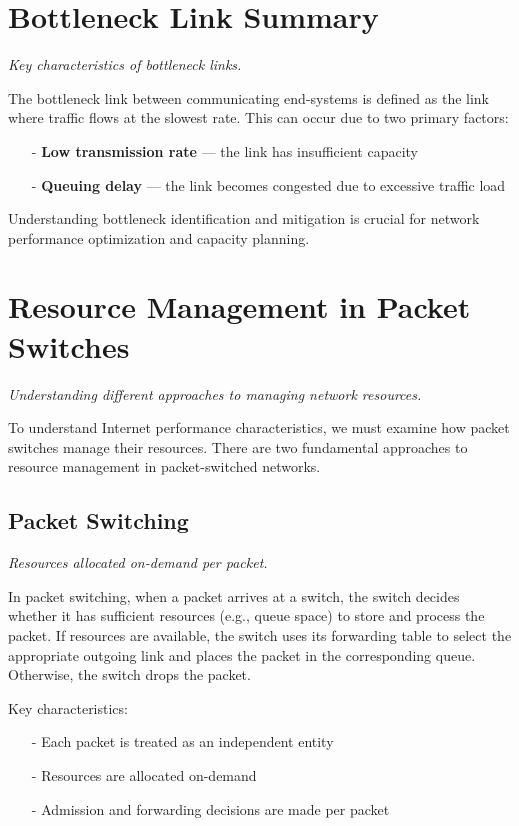 \documentclass[../../compsys.tex]{subfiles}
\begin{document}
\section{Bottleneck Link Summary}
\textit{Key characteristics of bottleneck links.}

The bottleneck link between communicating end-systems is defined as the link where traffic flows at the slowest rate. This can occur due to two primary factors:

\begin{itemize}
  \item[-] \textbf{Low transmission rate} — the link has insufficient capacity
  \item[-] \textbf{Queuing delay} — the link becomes congested due to excessive traffic load
\end{itemize}

Understanding bottleneck identification and mitigation is crucial for network performance optimization and capacity planning.

\section{Resource Management in Packet Switches}
\textit{Understanding different approaches to managing network resources.}

To understand Internet performance characteristics, we must examine how packet switches manage their resources. There are two fundamental approaches to resource management in packet-switched networks.

\subsection{Packet Switching}
\textit{Resources allocated on-demand per packet.}

In packet switching, when a packet arrives at a switch, the switch decides whether it has sufficient resources (e.g., queue space) to store and process the packet. If resources are available, the switch uses its forwarding table to select the appropriate outgoing link and places the packet in the corresponding queue. Otherwise, the switch drops the packet.

Key characteristics:
\begin{itemize}
  \item[-] Each packet is treated as an independent entity
  \item[-] Resources are allocated on-demand
  \item[-] Admission and forwarding decisions are made per packet
\end{itemize}
\end{document}
